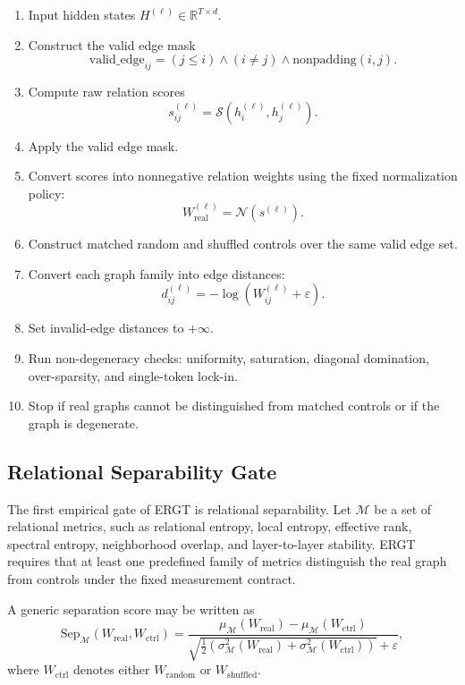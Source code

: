 \documentclass[11pt]{article}
\begin{document}
\begin{enumerate}[label=\arabic*.]
    \item Input hidden states $H^{(\ell)}\in\mathbb{R}^{T\times d}$.
    \item Construct the valid edge mask
    \[
    \mathrm{valid\_edge}_{ij}=(j\leq i)\land(i\neq j)\land\mathrm{nonpadding}(i,j).
    \]
    \item Compute raw relation scores
    \[
    s_{ij}^{(\ell)}=\mathcal{S}(h_i^{(\ell)},h_j^{(\ell)}).
    \]
    \item Apply the valid edge mask.
    \item Convert scores into nonnegative relation weights using the fixed normalization policy:
    \[
    W_{\mathrm{real}}^{(\ell)}=\mathcal{N}(s^{(\ell)}).
    \]
    \item Construct matched random and shuffled controls over the same valid edge set.
    \item Convert each graph family into edge distances:
    \[
    d_{ij}^{(\ell)}=-\log(W_{ij}^{(\ell)}+\varepsilon).
    \]
    \item Set invalid-edge distances to $+\infty$.
    \item Run non-degeneracy checks: uniformity, saturation, diagonal domination, over-sparsity, and single-token lock-in.
    \item Stop if real graphs cannot be distinguished from matched controls or if the graph is degenerate.
\end{enumerate}

\subsection{Relational Separability Gate}

The first empirical gate of ERGT is relational separability. Let $\mathcal{M}$ be a set of relational metrics, such as relational entropy, local entropy, effective rank, spectral entropy, neighborhood overlap, and layer-to-layer stability. ERGT requires that at least one predefined family of metrics distinguish the real graph from controls under the fixed measurement contract.

A generic separation score may be written as
\[
\mathrm{Sep}_{\mathcal{M}}(W_{\mathrm{real}},W_{\mathrm{ctrl}})
=
\frac{
\mu_{\mathcal{M}}(W_{\mathrm{real}})-\mu_{\mathcal{M}}(W_{\mathrm{ctrl}})
}{
\sqrt{\frac{1}{2}\left(\sigma_{\mathcal{M}}^2(W_{\mathrm{real}})+\sigma_{\mathcal{M}}^2(W_{\mathrm{ctrl}})\right)}+\varepsilon
},
\]
where $W_{\mathrm{ctrl}}$ denotes either $W_{\mathrm{random}}$ or $W_{\mathrm{shuffled}}$.
\end{document}

